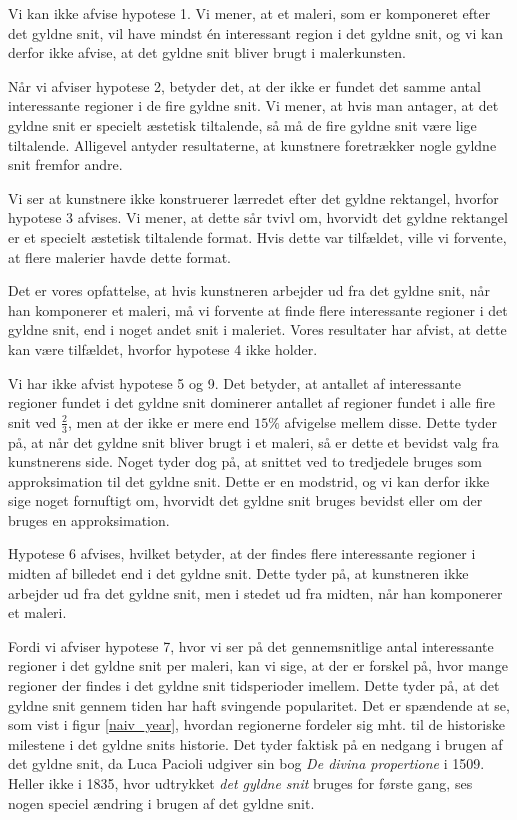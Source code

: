 {Vi kan ikke afvise hypotese 1. Vi mener, at et maleri, som er komponeret
efter det gyldne snit, vil have mindst én interessant region i det
gyldne snit, og vi kan derfor ikke afvise, at det gyldne snit bliver
brugt i malerkunsten.

Når vi afviser hypotese 2, betyder det, at der ikke er fundet det samme
antal interessante regioner i de fire gyldne snit. Vi mener, at hvis man
antager, at det gyldne snit er specielt æstetisk tiltalende, så må de
fire gyldne snit være lige tiltalende. Alligevel antyder resultaterne,
at kunstnere foretrækker nogle gyldne snit fremfor andre.

Vi ser at kunstnere ikke konstruerer lærredet efter det gyldne
rektangel, hvorfor hypotese 3 afvises. Vi mener, at dette sår tvivl om,
hvorvidt det gyldne rektangel er et specielt æstetisk tiltalende format.
Hvis dette var tilfældet, ville vi forvente, at flere malerier havde
dette format.

Det er vores opfattelse, at hvis kunstneren arbejder ud fra det gyldne
snit, når han komponerer et maleri, må vi forvente at finde flere
interessante regioner i det gyldne snit, end i noget andet snit i
maleriet. Vores resultater har afvist, at dette kan være tilfældet,
hvorfor hypotese 4 ikke holder.

Vi har ikke afvist hypotese 5 og 9. Det betyder, at antallet af
interessante regioner fundet i det gyldne snit dominerer antallet af
regioner fundet i alle fire snit ved $\frac{2}{3}$, men at der ikke er
mere end $15 \%$ afvigelse mellem disse. Dette tyder på, at når det
gyldne snit bliver brugt i et maleri, så er dette et bevidst valg fra
kunstnerens side. Noget tyder dog på, at snittet ved to tredjedele
bruges som approksimation til det gyldne snit. Dette er en modstrid, og
vi kan derfor ikke sige noget fornuftigt om, hvorvidt det gyldne snit
bruges bevidst eller om der bruges en approksimation.

Hypotese 6 afvises, hvilket betyder, at der findes flere interessante
regioner i midten af billedet end i det gyldne snit. Dette tyder på, at
kunstneren ikke arbejder ud fra det gyldne snit, men i stedet ud fra
midten, når han komponerer et maleri.

Fordi vi afviser hypotese 7, hvor vi ser på det gennemsnitlige antal
interessante regioner i det gyldne snit per maleri, kan vi sige, at der
er forskel på, hvor mange regioner der findes i det gyldne snit
tidsperioder imellem.  Dette tyder på, at det gyldne snit gennem
tiden har haft svingende popularitet. Det er spændende at se, som vist i
figur \ref{naiv_year}, hvordan regionerne fordeler sig mht. til
de historiske milestene i det gyldne snits historie. Det tyder faktisk
på en nedgang i brugen af det gyldne snit, da Luca Pacioli udgiver sin
bog \emph{De divina propertione} i 1509\cite{Markowsky1992}. Heller ikke
i 1835, hvor udtrykket \emph{det gyldne snit} bruges for første
gang\cite{Markowsky1992}, ses nogen speciel ændring i brugen af det
gyldne snit.

}
